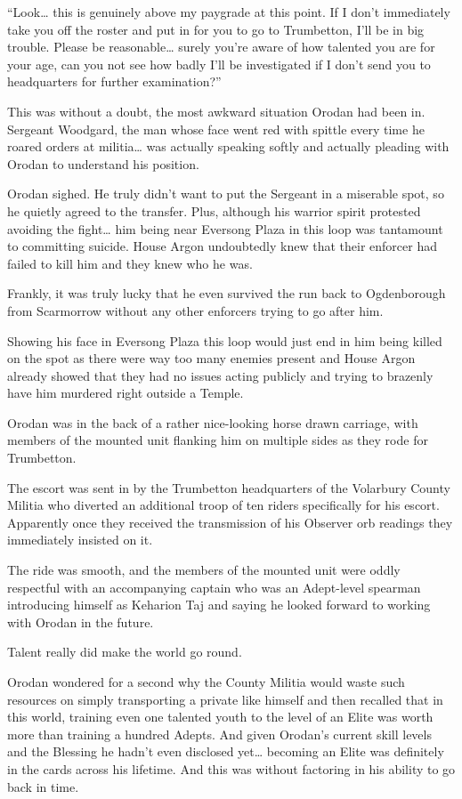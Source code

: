 \documentclass[a4paper,10pt]{book}
\begin{document}
“Look… this is genuinely above my paygrade at this point. If I don’t immediately take you off the roster and put in for you to go to Trumbetton, I’ll be in big trouble. Please be reasonable… surely you’re aware of how talented you are for your age, can you not see how badly I’ll be investigated if I don’t send you to headquarters for further examination?”\par
This was without a doubt, the most awkward situation Orodan had been in. Sergeant Woodgard, the man whose face went red with spittle every time he roared orders at militia… was actually speaking softly and actually pleading with Orodan to understand his position.\par
Orodan sighed. He truly didn’t want to put the Sergeant in a miserable spot, so he quietly agreed to the transfer. Plus, although his warrior spirit protested avoiding the fight… him being near Eversong Plaza in this loop was tantamount to committing suicide. House Argon undoubtedly knew that their enforcer had failed to kill him and they knew who he was.\par
Frankly, it was truly lucky that he even survived the run back to Ogdenborough from Scarmorrow without any other enforcers trying to go after him.\par
Showing his face in Eversong Plaza this loop would just end in him being killed on the spot as there were way too many enemies present and House Argon already showed that they had no issues acting publicly and trying to brazenly have him murdered right outside a Temple.\par
\par
Orodan was in the back of a rather nice-looking horse drawn carriage, with members of the mounted unit flanking him on multiple sides as they rode for Trumbetton.\par
The escort was sent in by the Trumbetton headquarters of the Volarbury County Militia who diverted an additional troop of ten riders specifically for his escort. Apparently once they received the transmission of his Observer orb readings they immediately insisted on it.\par
The ride was smooth, and the members of the mounted unit were oddly respectful with an accompanying captain who was an Adept-level spearman introducing himself as Keharion Taj and saying he looked forward to working with Orodan in the future.\par
Talent really did make the world go round.\par
Orodan wondered for a second why the County Militia would waste such resources on simply transporting a private like himself and then recalled that in this world, training even one talented youth to the level of an Elite was worth more than training a hundred Adepts. And given Orodan’s current skill levels and the Blessing he hadn’t even disclosed yet… becoming an Elite was definitely in the cards across his lifetime. And this was without factoring in his ability to go back in time.\par
\end{document}
